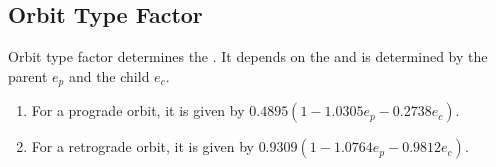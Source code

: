 \documentclass[letterpaper,10pt,english]{sphinxmanual}
\begin{document}
\subsection{Orbit Type Factor}
\label{\detokenize{quantities/orbital/orbit_type_factor:orbit-type-factor}}\label{\detokenize{quantities/orbital/orbit_type_factor::doc}}\label{\detokenize{quantities/orbital/orbit_type_factor:id1}}
\sphinxAtStartPar
Orbit type factor determines the {\hyperref[\detokenize{quantities/orbital/semi_major_axis_maximum_limit:id1}]{}}.
It depends on the {\hyperref[\detokenize{quantities/orbital/orbit_type:id1}]{}} and is determined by the parent {\hyperref[\detokenize{quantities/orbital/eccentricity:id1}]{}} \(e_p\)
and the child {\hyperref[\detokenize{quantities/orbital/eccentricity:id1}]{}} \(e_c\).
\begin{enumerate}
%
\item {} 
\sphinxAtStartPar
For a prograde orbit, it is given by \(0.4895 (1 - 1.0305 e_p - 0.2738 e_c)\).

\item {} 
\sphinxAtStartPar
For a retrograde orbit, it is given by \(0.9309 (1 - 1.0764 e_p - 0.9812 e_c)\).

\end{enumerate}
\end{document}
